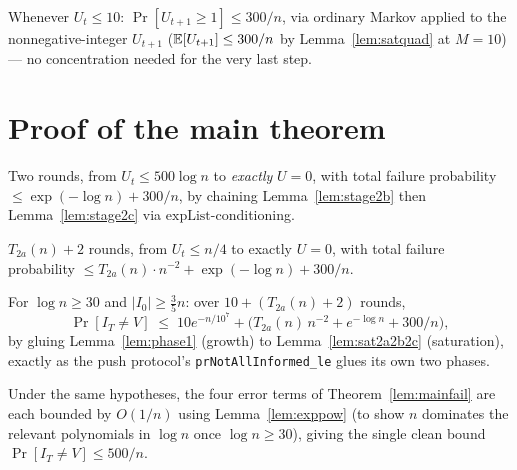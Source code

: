 \begin{lemma}[Stage 2c]\label{lem:stage2c}
  \leanok
  Whenever $U_t\le10$: $\Pr[U_{t+1}\ge1] \le 300/n$, via ordinary Markov
  applied to the nonnegative-integer $U_{t+1}$ ($\mathbb{E}[U_{t+1}]\le300/n$ by
  Lemma~\ref{lem:satquad} at $M=10$) --- no concentration needed for the
  very last step.
\end{lemma}

\section{Proof of the main theorem}\label{sec:proof-main}

\begin{lemma}\label{lem:sat2b2c}
  \leanok
  Two rounds, from $U_t\le500\log n$ to \emph{exactly} $U=0$, with total
  failure probability $\le\exp(-\log n)+300/n$, by chaining
  Lemma~\ref{lem:stage2b} then Lemma~\ref{lem:stage2c} via
  $\mathrm{expList}$-conditioning.
\end{lemma}

\begin{lemma}\label{lem:sat2a2b2c}
  \leanok
  $T_{2a}(n)+2$ rounds, from $U_t\le n/4$ to exactly $U=0$, with total
  failure probability $\le T_{2a}(n)\cdot n^{-2} + \exp(-\log n) + 300/n$.
\end{lemma}

\begin{theorem}\label{lem:mainfail}
  \leanok
  For $\log n\ge30$ and $|I_0|\ge\tfrac35n$: over $10+(T_{2a}(n)+2)$
  rounds,
  \[
    \Pr[I_T\ne V] \;\le\; 10e^{-n/10^7}
      + \bigl(T_{2a}(n)\,n^{-2} + e^{-\log n} + 300/n\bigr),
  \]
  by gluing Lemma~\ref{lem:phase1} (growth) to
  Lemma~\ref{lem:sat2a2b2c} (saturation), exactly as the push protocol's
  \texttt{prNotAllInformed\_le} glues its own two phases.
\end{theorem}

\begin{theorem}\label{lem:mainfailclean}
  \leanok
  Under the same hypotheses, the four error terms of
  Theorem~\ref{lem:mainfail} are each bounded by $O(1/n)$ using
  Lemma~\ref{lem:exppow} (to show $n$ dominates the relevant polynomials in
  $\log n$ once $\log n\ge30$), giving the single clean bound
  $\Pr[I_T\ne V] \le 500/n$.
\end{theorem}

